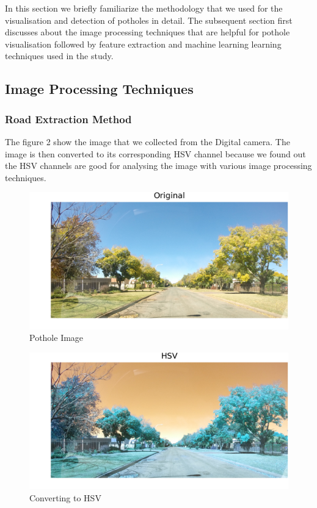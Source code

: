 \documentclass[journal]{IEEEtran}
\begin{document}
In this section we briefly familiarize the methodology that we used for the visualisation and detection of potholes in detail. The subsequent section first discusses about the image processing techniques that are helpful for pothole visualisation followed by feature extraction and machine learning learning techniques  used in the study.

\subsection{Image Processing Techniques}

\subsubsection{Road Extraction Method}

The figure 2 show the image that we collected from the Digital camera. The image is then converted to its corresponding HSV channel because we found out the HSV channels are good for analysing the image with various image processing techniques. 

\begin{figure}[!htb]
\begin{center}
\includegraphics[scale=0.25]{Images/0_Original.png}
\end{center}
\caption{Pothole Image}
\end{figure}


\begin{figure}[!htb]
\begin{center}
\includegraphics[scale=0.25]{Images/1_HSV.png}
\end{center}
\caption{Converting to HSV}
\end{figure}
\end{document}
